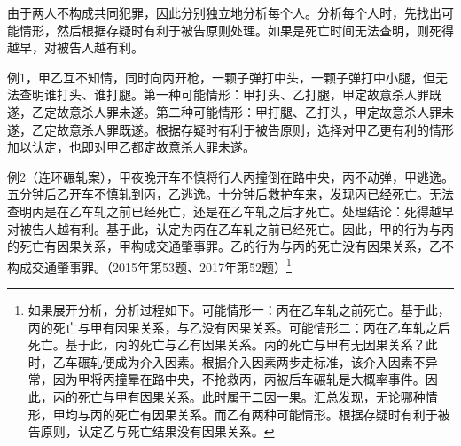 由于两人不构成共同犯罪，因此分别独立地分析每个人。分析每个人时，先找出可能情形，然后根据存疑时有利于被告原则处理。如果是死亡时间无法查明，则死得越早，对被告人越有利。

例1，甲乙互不知情，同时向丙开枪，一颗子弹打中头，一颗子弹打中小腿，但无法查明谁打头、谁打腿。第一种可能情形：甲打头、乙打腿，甲定故意杀人罪既遂，乙定故意杀人罪未遂。第二种可能情形：甲打腿、乙打头，甲定故意杀人罪未遂，乙定故意杀人罪既遂。根据存疑时有利于被告原则，选择对甲乙更有利的情形加以认定，也即对甲乙都定故意杀人罪未遂。

例2（连环碾轧案），甲夜晚开车不慎将行人丙撞倒在路中央，丙不动弹，甲逃逸。五分钟后乙开车不慎轧到丙，乙逃逸。十分钟后救护车来，发现丙已经死亡。无法查明丙是在乙车轧之前已经死亡，还是在乙车轧之后才死亡。处理结论：死得越早对被告人越有利。基于此，认定为丙在乙车轧之前已经死亡。因此，甲的行为与丙的死亡有因果关系，甲构成交通肇事罪。乙的行为与丙的死亡没有因果关系，乙不构成交通肇事罪。（2015年第53题、2017年第52题）\footnote{如果展开分析，分析过程如下。可能情形一：丙在乙车轧之前死亡。基于此，丙的死亡与甲有因果关系，与乙没有因果关系。可能情形二：丙在乙车轧之后死亡。基于此，丙的死亡与乙有因果关系。丙的死亡与甲有无因果关系？此时，乙车碾轧便成为介入因素。根据介入因素两步走标准，该介入因素不异常，因为甲将丙撞晕在路中央，不抢救丙，丙被后车碾轧是大概率事件。因此，丙的死亡与甲有因果关系。此时属于二因一果。汇总发现，无论哪种情形，甲均与丙的死亡有因果关系。而乙有两种可能情形。根据存疑时有利于被告原则，认定乙与死亡结果没有因果关系。}

